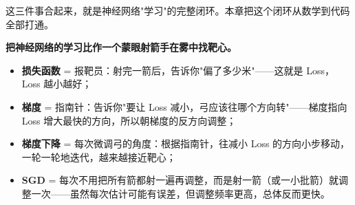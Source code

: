 \documentclass[a4paper,11pt]{ctexart}
\begin{document}
这三件事合起来，就是神经网络"学习"的完整闭环。本章把这个闭环从数学到代码全部打通。

\begin{metaphorbox}
    \textbf{把神经网络的学习比作一个蒙眼射箭手在雾中找靶心。}

    \begin{itemize}
        \item \textbf{损失函数} = 报靶员：射完一箭后，告诉你"偏了多少米"——这就是 Loss，Loss 越小越好；
        \item \textbf{梯度} = 指南针：告诉你"要让 Loss 减小，弓应该往哪个方向转"——梯度指向 Loss 增大最快的方向，所以朝梯度的反方向调整；
        \item \textbf{梯度下降} = 每次微调弓的角度：根据指南针，往减小 Loss 的方向小步移动，一轮一轮地迭代，越来越接近靶心；
        \item \textbf{SGD} = 每次不用把所有箭都射一遍再调整，而是射一箭（或一小批箭）就调整一次——虽然每次估计可能有误差，但调整频率更高，总体反而更快。
    \end{itemize}
\end{metaphorbox}
\end{document}
